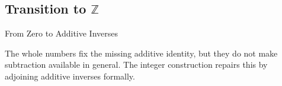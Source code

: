 
\subsection{Transition to \texorpdfstring{$\mathbb{Z}$}{Z}}
\label{sec:transition-to-z}
\begin{topicbox}{From Zero to Additive Inverses}
\begin{exposition}
The whole numbers fix the missing additive identity, but they do not make
subtraction available in general. The integer construction repairs this by
adjoining additive inverses formally.
\end{exposition}
\end{topicbox}
